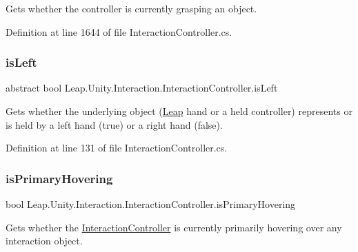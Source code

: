 Gets whether the controller is currently grasping an object. 



Definition at line 1644 of file Interaction\+Controller.\+cs.

\mbox{\label{class_leap_1_1_unity_1_1_interaction_1_1_interaction_controller_ae14f805d22faabfecf3c6b818e97374a}} 
\subsubsection{\texorpdfstring{isLeft}{isLeft}}
{\footnotesize\ttfamily abstract bool Leap.\+Unity.\+Interaction.\+Interaction\+Controller.\+is\+Left\hspace{0.3cm}{\ttfamily [get]}}



Gets whether the underlying object (\mbox{\hyperlink{namespace_leap_1_1_unity_1_1_leap}{Leap}} hand or a held controller) represents or is held by a left hand (true) or a right hand (false). 



Definition at line 131 of file Interaction\+Controller.\+cs.

\mbox{\label{class_leap_1_1_unity_1_1_interaction_1_1_interaction_controller_ad4ef88d6265a7fce226b2f873237e45c}} 
\subsubsection{\texorpdfstring{isPrimaryHovering}{isPrimaryHovering}}
{\footnotesize\ttfamily bool Leap.\+Unity.\+Interaction.\+Interaction\+Controller.\+is\+Primary\+Hovering\hspace{0.3cm}{\ttfamily [get]}}



Gets whether the \mbox{\hyperlink{class_leap_1_1_unity_1_1_interaction_1_1_interaction_controller}{Interaction\+Controller}} is currently primarily hovering over any interaction object. 



